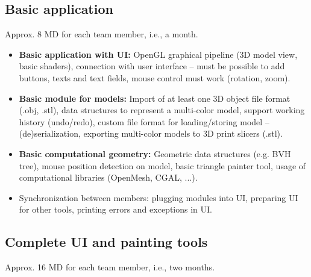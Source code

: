 \subsection{Basic application}

Approx. 8 MD for each team member, i.e., a month.

\begin{itemize}
\item \textbf{Basic application with UI:} OpenGL graphical pipeline (3D model view, basic shaders), connection with user interface -- must be possible to add buttons, texts and text fields, mouse control must work (rotation, zoom).
\item \textbf{Basic module for models:} Import of at least one 3D object file format (.obj, .stl), data structures to represent a multi-color model, support working history (undo/redo), custom file format for loading/storing model -- (de)serialization, exporting multi-color models to 3D print slicers (.stl).
\item \textbf{Basic computational geometry:} Geometric data structures (e.g. BVH tree), mouse position detection on model, basic triangle painter tool, usage of computational libraries (OpenMesh, CGAL, ...).
\item Synchronization between members: plugging modules into UI, preparing UI for other tools, printing errors and exceptions in UI.
\end{itemize}


\subsection{Complete UI and painting tools}

Approx. 16 MD for each team member, i.e., two months.

